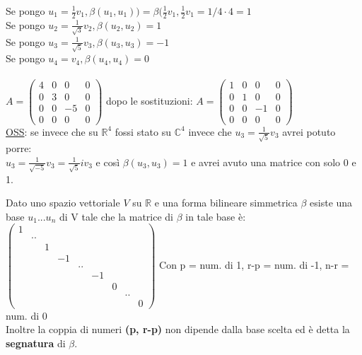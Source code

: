 \documentclass[12pt]{article}
\begin{document}
Se pongo $u_1 = \frac{1}{2}v_1, \beta(u_1,u_1) ) = \beta(\frac{1}{2}v_1, \frac{1}{2}v_1 = 1/4 \cdot 4 = 1$\\
Se pongo $u_2 = \frac{1}{\sqrt{3}}v_2, \beta(u_2,u_2) = 1$\\
Se pongo $u_3 = \frac{1}{\sqrt{5}}v_3, \beta(u_3,u_3) = -1$\\
Se pongo $u_4 = v_4, \beta(u_4,u_4) = 0$\\\\
$A = \begin{pmatrix}
    4 & 0 & 0 & 0\\
    0 & 3 & 0 & 0\\
    0 & 0 & -5 & 0\\
    0 & 0 & 0 & 0
\end{pmatrix}$ dopo le sostituzioni: $A = \begin{pmatrix}
    1 & 0 & 0 & 0\\
    0 & 1 & 0 & 0\\
    0 & 0 & -1 & 0\\
    0 & 0 & 0 & 0
\end{pmatrix}$\\
\underline{OSS}: se invece che su $\mathbb{R}^4$ fossi stato su $\mathbb{C}^4$ invece che $u_3 = \frac{1}{\sqrt{5}}v_3$ avrei potuto porre:\\ $u_3 = \frac{1}{\sqrt{-5}}v_3 = \frac{1}{\sqrt{5}}iv_3 $
e così $\beta(u_3,u_3) = 1$ e avrei avuto una matrice con solo 0 e 1.\\
\begin{theorem}[Sylvester]
Dato uno spazio vettoriale $V$ su $\mathbb{R}$ e una forma bilineare simmetrica $\beta$ esiste una base $u_1...u_n$ di V tale che la matrice di $\beta$ in tale base è:\\
$\begin{pmatrix}
    1 & & & & & & &\\
    & .. & & & & & & \\
    & & 1 & & & &  \\
    & & & -1 & & & \\
    & & & & .. & & & \\
    & & & & & -1 & & \\
    & & & & & & 0 & & \\
    & & & & & & & .. & \\
    & & & & & & & & 0
\end{pmatrix}$
Con p = num. di 1, r-p = num. di -1, n-r = num. di 0\\
Inoltre la coppia di numeri \textbf{(p, r-p)} non dipende dalla base scelta ed è detta la \textbf{segnatura} di $\beta$.
\end{theorem}
\end{document}
